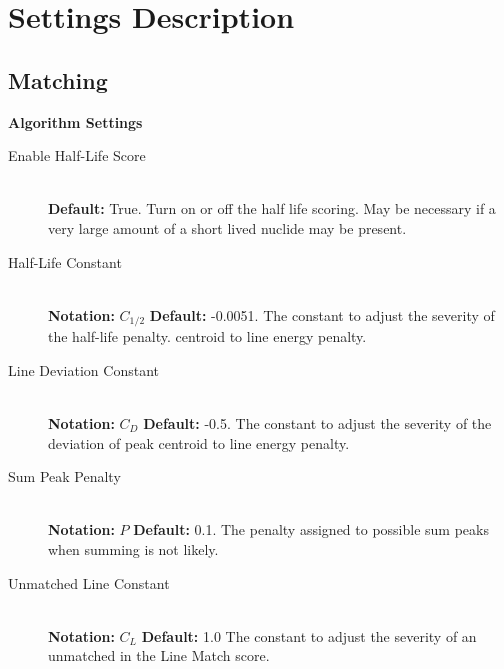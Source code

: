 \documentclass[12pt,report,justified]{SANDreport}
\begin{document}
    \nocite{*}

    
    


    \appendix
    \chapter{Settings Description} \label{sec:set_desc}

      \section{Matching}
\begin{center}
{\large \textbf{Algorithm Settings}}
\end{center}
\begin{description}
\item[Enable Half-Life Score] \label{itm:hl_score} \hfill \\
\textbf{Default:} True. Turn on or off the half life scoring. May be necessary if a very large amount
of a short lived nuclide may be present.
\item[Half-Life Constant] \label{itm:hl_const} \hfill \\
\textbf{Notation:} \( C_{1/2}\) \textbf{Default:} -0.0051. The constant to adjust the severity of the half-life penalty.
centroid to line energy penalty.
\item[Line Deviation Constant] \label{itm:ln_dev_const} \hfill \\
\textbf{Notation:} \( C_D\) \textbf{Default:} -0.5. The constant to adjust the severity of the deviation of peak
centroid to line energy penalty.
\item[Sum Peak Penalty] \label{itm:sm_peak_pen} \hfill \\
\textbf{Notation:} \( P\) \textbf{Default:} 0.1. The penalty assigned to possible sum peaks when summing is
not likely.
\item[Unmatched Line Constant] \label{itm:um_line_const} \hfill \\
\textbf{Notation:} \( C_L\) \textbf{Default:} 1.0 The constant to adjust the severity of an unmatched in the Line Match score.
\end{description}
\end{document}
